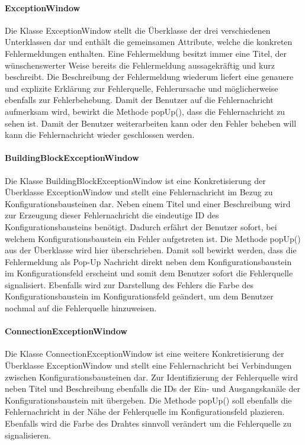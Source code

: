 \documentclass[parskip=full]{scrartcl}
\begin{document}
\paragraph{ExceptionWindow}

Die Klasse ExceptionWindow stellt die Überklasse der drei verschiedenen Unterklassen dar und enthält die gemeinsamen Attribute, welche die konkreten Fehlermeldungen enthalten. Eine Fehlermeldung besitzt immer eine Titel, der wünschenswerter Weise bereits die Fehlermeldung aussagekräftig und kurz beschreibt. Die Beschreibung der Fehlermeldung wiederum liefert eine genauere und explizite Erklärung zur Fehlerquelle, Fehlerursache und möglicherweise ebenfalls zur Fehlerbehebung.
Damit der Benutzer auf die Fehlernachricht aufmerksam wird, bewirkt die Methode popUp(), dass die Fehlernachricht zu sehen ist. Damit der Benutzer weiterarbeiten kann oder den Fehler beheben will kann die Fehlernachricht wieder geschlossen werden.

\paragraph{BuildingBlockExceptionWindow}

Die Klasse BuildingBlockExceptionWindow ist eine Konkretisierung der Überklasse ExceptionWindow und stellt eine Fehlernachricht im Bezug zu Konfigurationsbausteinen dar. Neben einem Titel und einer Beschreibung wird zur Erzeugung dieser Fehlernachricht die eindeutige ID des Konfigurationsbausteins benötigt. Dadurch erfährt der Benutzer sofort, bei welchem Konfigurationsbaustein ein Fehler aufgetreten ist. Die Methode popUp() aus der Überklasse wird hier überschrieben. Damit soll bewirkt werden, dass die Fehlermeldung als Pop-Up Nachricht direkt neben dem Konfigurationsbaustein im Konfigurationsfeld erscheint und somit dem Benutzer sofort die Fehlerquelle signalisiert. Ebenfalls wird zur Darstellung des Fehlers die Farbe des Konfigurationsbaustein im Konfigurationsfeld geändert, um dem Benutzer nochmal auf die Fehlerquelle hinzuweisen.

\paragraph{ConnectionExceptionWindow}

Die Klasse ConnectionExceptionWindow ist eine weitere Konkretisierung der Überklasse ExceptionWindow und stellt eine Fehlernachricht bei Verbindungen zwischen Konfigurationsbausteinen dar. Zur Identifizierung der Fehlerquelle wird neben Titel und Beschreibung ebenfalls die IDs der Ein- und Ausgangskanäle der Konfigurationsbaustein mit übergeben. Die Methode popUp() soll ebenfalls die Fehlernachricht in der Nähe der Fehlerquelle im Konfigurationsfeld plazieren. Ebenfalls wird die Farbe des Drahtes sinnvoll verändert um die Fehlerquelle zu signalisieren.
\end{document}
